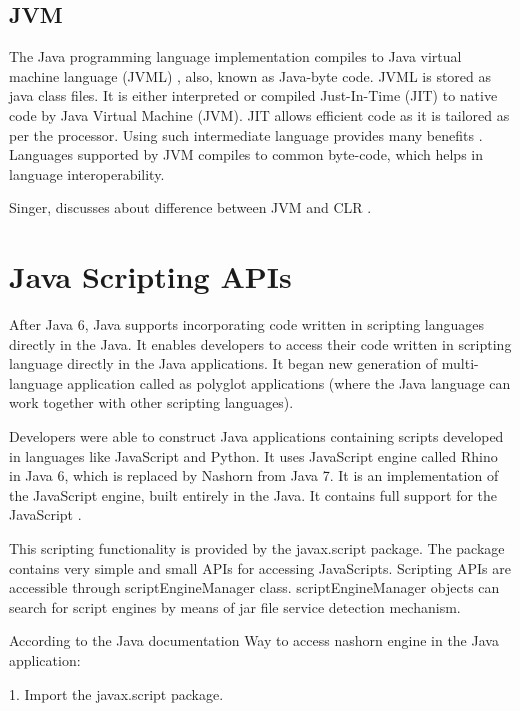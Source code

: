 \subsection{JVM}

The Java programming language \cite{Gosling:1996:JLS:560667} implementation compiles to Java virtual machine language (JVML) \cite{Lindholm:2014:JVM:2636992},  also, known as Java-byte code. JVML is stored as java class files. It is either interpreted or compiled Just-In-Time (JIT) to native code by Java Virtual Machine (JVM). JIT allows efficient code as it is tailored as per the processor. Using such intermediate language provides many benefits \cite{clrspecification}. Languages supported by JVM compiles to common byte-code, which helps in language interoperability.

Singer, discusses about difference between JVM and CLR \cite{Singer:2003:JVC:957289.957341}.

\section{Java Scripting APIs}

After Java 6, Java supports incorporating code written in scripting languages directly in the Java. It enables developers to access their code written in scripting language directly in the Java applications. It began new generation of multi-language application called as polyglot applications (where the Java language can work together with other scripting languages). \cite{Juneau2017}

Developers were able to construct Java applications containing scripts developed in languages like JavaScript and Python. It uses JavaScript engine called Rhino \cite{rhinojava} in Java 6, which is replaced by Nashorn \cite{nashornjava} from Java 7. It is an implementation of the JavaScript engine, built entirely in the Java. It contains full support for the JavaScript \cite{Juneau2017}.


This scripting functionality is provided by the javax.script package. The package contains very simple and small APIs for accessing JavaScripts. Scripting APIs are accessible through scriptEngineManager class. scriptEngineManager objects can search for script engines by means of jar file service detection mechanism.

According to the Java documentation \cite{javascripting} Way to access nashorn engine in the Java application:

1.	Import the javax.script package.

